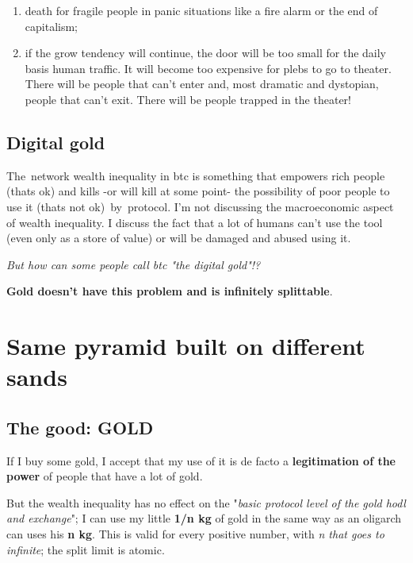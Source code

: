 \documentclass{article}
\begin{document}
\begin{enumerate}


        \item death for fragile people in panic situations like a fire alarm or the end of capitalism;

	\item if the grow tendency will continue, the door will be too small for the daily basis human traffic. It will become too expensive for plebs to go to theater. There will be people that can't enter and, most dramatic and dystopian, people that can't exit. There will be people trapped in the theater!\vspace{0.2cm}


\end{enumerate}



\subsection{Digital gold}


The network wealth inequality in btc is something that empowers rich people (thats ok) and kills -or will kill at some point- the possibility of poor people to use it (thats not ok) by protocol. I'm not discussing the macroeconomic aspect of wealth inequality. I discuss the fact that a lot of humans can't use the tool (even only as a store of value) or will be damaged and abused using it.


\emph{But how can some people call btc "the digital gold"!?}


\textbf{Gold doesn't have this problem and is infinitely splittable}.\vspace{0.5cm}


\section{Same pyramid built on different sands}\vspace{0.3cm}




\subsection{The good: GOLD}


If I buy some gold, I accept that my use of it is de facto a \textbf{legitimation of the power} of people that have a lot of gold.


But the wealth inequality has no effect on the "\emph{basic protocol level of the gold hodl and exchange}"; I can use my little \textbf{1/n kg} of gold in the same way as an oligarch can uses his \textbf{n kg}. This is valid for every positive number, with \emph{n that goes to infinite}; the split limit is atomic.\vspace{0.5cm}
\end{document}
